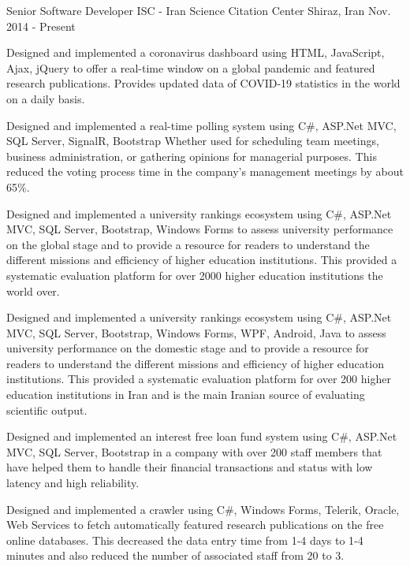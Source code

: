 


\begin{cventries}


\cventry
{Senior Software Developer} %
{ISC - Iran Science Citation Center} %
{Shiraz, Iran} %
{Nov. 2014 - Present} %
{ %
\begin{cvitems}
\item {Designed and implemented a coronavirus dashboard using HTML, JavaScript, Ajax, jQuery to offer a real-time window on a global pandemic and featured research publications. Provides updated data of COVID-19 statistics in the world on a daily basis.}
\item {Designed and implemented a real-time polling system using C\#, ASP.Net MVC, SQL Server, SignalR, Bootstrap Whether used for scheduling team meetings, business administration, or gathering opinions for managerial purposes. This reduced the voting process time in the company's management meetings by about 65\%.}
\item {Designed and implemented a university rankings ecosystem using C\#, ASP.Net MVC, SQL Server, Bootstrap, Windows Forms to assess university performance on the global stage and to provide a resource for readers to understand the different missions and efficiency of higher education institutions. This provided a systematic evaluation platform for over 2000 higher education institutions the world over.}
\item {Designed and implemented a university rankings ecosystem using C\#, ASP.Net MVC, SQL Server, Bootstrap, Windows Forms, WPF, Android, Java to assess university performance on the domestic stage and to provide a resource for readers to understand the different missions and efficiency of higher education institutions. This provided a systematic evaluation platform for over 200 higher education institutions in Iran and is the main Iranian source of evaluating scientific output.}
\item {Designed and implemented an interest free loan fund system using C\#, ASP.Net MVC, SQL Server, Bootstrap in a company with over 200 staff members that have helped them to handle their financial transactions and status with low latency and high reliability.}
\item {Designed and implemented a crawler using C\#, Windows Forms, Telerik, Oracle, Web Services to fetch automatically featured research publications on the free online databases. This decreased the data entry time from 1‑4 days to 1‑4 minutes and also reduced the number of associated staff from 20 to 3.}
\end{cvitems}
}


\end{cventries}